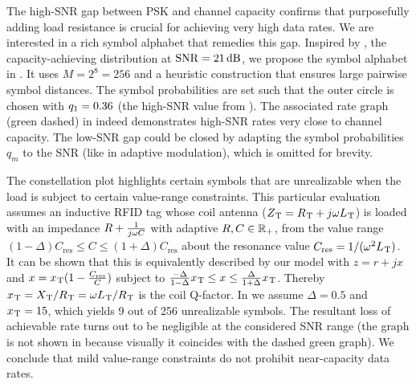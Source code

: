 The high-SNR gap between PSK and channel capacity confirms that purposefully adding load resistance is crucial for achieving very high data rates. We are interested in a rich symbol alphabet that remedies this gap. Inspired by , the capacity-achieving distribution at $\mathrm{SNR} = 21\,\mathrm{dB}$, we propose the symbol alphabet in . It uses $M = 2^8 = 256$ and a heuristic construction that ensures large pairwise symbol distances. The symbol probabilities are set such that the outer circle is chosen with $q_1 = 0.36$ (the high-SNR value from ). The associated rate graph (green dashed) in  indeed demonstrates high-SNR rates very close to channel capacity. The low-SNR gap could be closed by adapting the symbol probabilities $q_m$ to the SNR (like in adaptive modulation), which is omitted for brevity.

The constellation plot  highlights certain symbols that are unrealizable when the load is subject to certain value-range constraints. This particular evaluation assumes an inductive RFID tag whose coil antenna ($Z_{\hspace{.2mm}\mathrm{T}} = R_{\hspace{.2mm}\mathrm{T}} + j\omega L_{\hspace{.2mm}\mathrm{T}}$) is loaded with an impedance $R+\frac{1}{j\omega C}$ with adaptive $R,C \in \mathbb{R}_+$, from the value range
$(1-\Delta)C_\text{res} \leq C \leq (1+\Delta)C_\text{res}$
about the resonance value
$C_\text{res} = 1/(\omega^2 L_{\hspace{.2mm}\mathrm{T}})$.
It can be shown that this is equivalently described by our  model with
$z = r + jx$
and
$x = x_{\hspace{.2mm}\mathrm{T}} (1 - \frac{C_\text{res}}{C})$
subject to
$\frac{-\Delta}{1-\Delta} x_{\hspace{.2mm}\mathrm{T}} \leq x \leq \frac{\Delta}{1+\Delta} x_{\hspace{.2mm}\mathrm{T}}$. Thereby $x_{\hspace{.2mm}\mathrm{T}} = X_{\hspace{.2mm}\mathrm{T}} / R_{\hspace{.2mm}\mathrm{T}} = \omega L_{\hspace{.2mm}\mathrm{T}} / R_{\hspace{.2mm}\mathrm{T}}$ is the coil Q-factor.
In  we assume $\Delta = 0.5$ and $x_{\hspace{.2mm}\mathrm{T}} = 15$, which yields 9 out of 256 unrealizable symbols. The resultant loss of achievable rate turns out to be negligible at the considered SNR range (the graph is not shown in  because visually it coincides with the dashed green graph). We conclude that mild value-range constraints do not prohibit near-capacity data rates.

